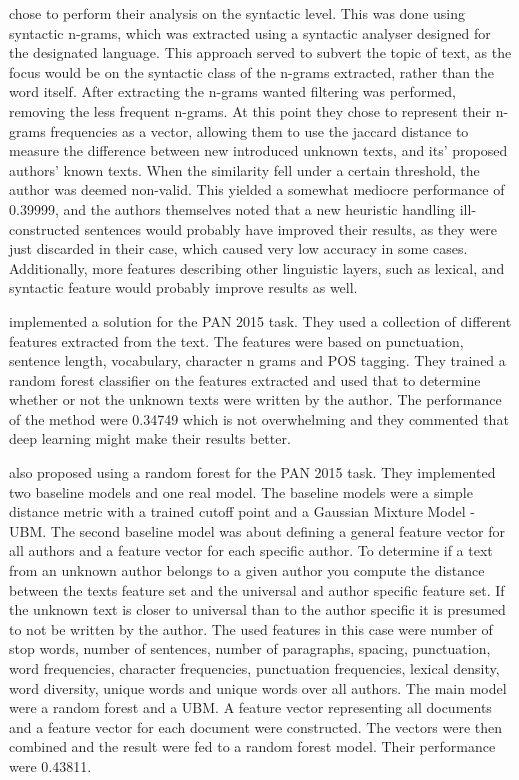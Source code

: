 \cite{juanpablo2015} chose to perform their analysis on the syntactic level.
This was done using syntactic n-grams, which was extracted using a syntactic
analyser designed for the designated language. This approach served to subvert
the topic of text, as the focus would be on the syntactic class of the n-grams
extracted, rather than the word itself. After extracting the n-grams wanted
filtering was performed, removing the less frequent n-grams. At this point
they chose to represent their n-grams frequencies as a vector, allowing them
to use the jaccard distance to measure the difference between new introduced
unknown texts, and its' proposed authors' known texts. When the similarity fell
under a certain threshold, the author was deemed non-valid. This yielded a
somewhat mediocre performance of 0.39999, and the authors themselves noted that
a new heuristic handling ill-constructed sentences would probably have improved
their results, as they were just discarded in their case, which caused very low
accuracy in some cases. Additionally, more features describing other linguistic
layers, such as lexical, and syntactic feature would probably improve results as
well.

\cite{maitra2015} implemented a solution for the PAN 2015 task. They used a
collection of different features extracted from the text. The features were
based on punctuation, sentence length, vocabulary, character n grams and
\gls{POS} tagging. They trained a random forest classifier on the features
extracted and used that to determine whether or not the unknown texts were
written by the author. The performance of the method were 0.34749 which is not
overwhelming and they commented that deep learning might make their results
better.

\cite{pacheco2015} also proposed using a random forest for the PAN 2015 task.
They implemented two baseline models and one real model. The baseline models
were a simple distance metric with a trained cutoff point and a Gaussian Mixture
Model - \gls{UBM}. The second baseline model was about defining a general
feature vector for all authors and a feature vector for each specific author. To
determine if a text from an unknown author belongs to a given author you compute
the distance between the texts feature set and the universal and author specific
feature set. If the unknown text is closer to universal than to the author
specific it is presumed to not be written by the author. The used features in
this case were number of stop words, number of sentences, number of paragraphs,
spacing, punctuation, word frequencies, character frequencies, punctuation
frequencies, lexical density, word diversity, unique words and unique words
over all authors. The main model were a random forest and a \gls{UBM}. A feature
vector representing all documents and a feature vector for each document were
constructed. The vectors were then combined and the result were fed to a random
forest model. Their performance were 0.43811.

